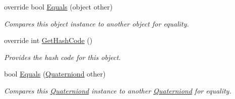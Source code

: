 \begin{DoxyCompactItemize}
override bool \hyperlink{struct_open_t_k_1_1_quaterniond_afbac036863da104ad691f0bb7f08bb28}{Equals} (object other)
\begin{DoxyCompactList}\small\item\em Compares this object instance to another object for equality. \end{DoxyCompactList}\item 
override int \hyperlink{struct_open_t_k_1_1_quaterniond_a220b1fc82beba2b29084ada276e6d421}{Get\-Hash\-Code} ()
\begin{DoxyCompactList}\small\item\em Provides the hash code for this object. \end{DoxyCompactList}\item 
bool \hyperlink{struct_open_t_k_1_1_quaterniond_a65b02dfedb9ceb37b138829fa886c317}{Equals} (\hyperlink{struct_open_t_k_1_1_quaterniond}{Quaterniond} other)
\begin{DoxyCompactList}\small\item\em Compares this \hyperlink{struct_open_t_k_1_1_quaterniond}{Quaterniond} instance to another \hyperlink{struct_open_t_k_1_1_quaterniond}{Quaterniond} for equality. \end{DoxyCompactList}\end{DoxyCompactItemize}
